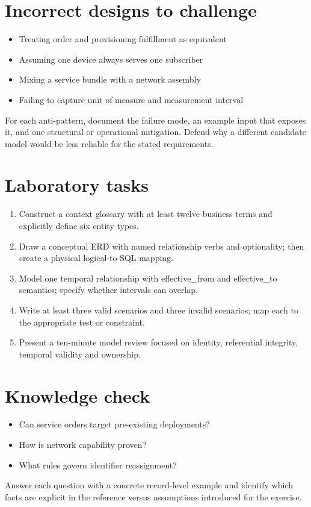 \documentclass[11pt,letterpaper]{article}
\begin{document}
\section{Incorrect designs to challenge}
\begin{itemize}
\item Treating order and provisioning fulfillment as equivalent
\item Assuming one device always serves one subscriber
\item Mixing a service bundle with a network assembly
\item Failing to capture unit of measure and measurement interval
\end{itemize}
For each anti-pattern, document the failure mode, an example input that exposes it, and one structural or operational mitigation. Defend why a different candidate model would be less reliable for the stated requirements.


\section{Laboratory tasks}
\begin{enumerate}
\item Construct a context glossary with at least twelve business terms and explicitly define six entity types.
\item Draw a conceptual ERD with named relationship verbs and optionality; then create a physical logical-to-SQL mapping.
\item Model one temporal relationship with effective\_from and effective\_to semantics; specify whether intervals can overlap.
\item Write at least three valid scenarios and three invalid scenarios; map each to the appropriate test or constraint.
\item Present a ten-minute model review focused on identity, referential integrity, temporal validity and ownership.
\end{enumerate}

\section{Knowledge check}
\begin{itemize}
\item Can service orders target pre-existing deployments?
\item How is network capability proven?
\item What rules govern identifier reassignment?
\end{itemize}
Answer each question with a concrete record-level example and identify which facts are explicit in the reference versus assumptions introduced for the exercise.
\end{document}

